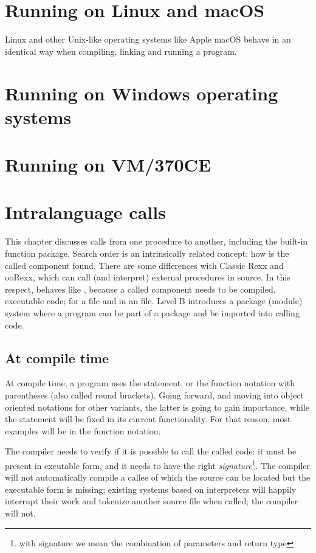 \chapter{Running \crexx{} on Linux and macOS}
Linux and other Unix-like operating systems like Apple macOS behave in
an identical way when compiling, linking and running a \crexx{}
program.

\chapter{Running \crexx{} on Windows operating systems}
\chapter{Running \crexx{} on VM/370CE}
\chapter{Intralanguage calls}
This chapter discusses calls from one \crexx{} procedure to another,
including the built-in function package. Search order is an
intrinsically related concept: how is the called component found. There
are some differences with Classic Rexx and ooRexx, which can call (and interpret)
external procedures in source. In this respect, \crexx{} behaves like
\nr{}, because a called component needs to be compiled, executable
code; for \nr{} a  file and in \crexx{} an 
file. Level B introduces a package (module) system where a program can
be part of a package and be imported into calling code.
\section{At compile time}
At compile time, a program uses the  statement, or the
function notation with parentheses (also called round brackets). Going
forward, and moving into object oriented notations for other \rexx{}
variants, the latter is going to gain importance, while the
 statement will be fixed in its current functionality. For
that reason, most examples will be in the function notation.

The compiler needs to verify if it is possible to call the called
code: it must be present in excutable form, and it needs to have the right
\emph{signature}\footnote{with signature we mean the combination of
  parameters and return type}. The compiler will not automatically compile a callee
of which the source can be located but the executable form is missing;
existing systems based on interpreters will happily interrupt their
work and tokenize another source file when called; the \crexx{}
 compiler will not.

